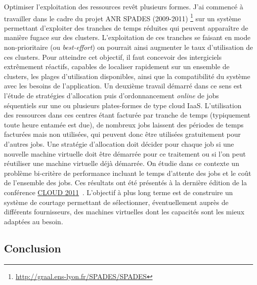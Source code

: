 \documentclass[11pt]{article}
\begin{document}
Optimiser l'exploitation des ressources revêt plusieurs formes. J'ai commencé à
travailler dans le cadre du projet ANR SPADES (2009-2011)%
\footnote{\url{http://graal.ens-lyon.fr/SPADES/SPADES}}  
sur un système permettant d'exploiter des tranches de temps réduites qui 
peuvent apparaître de manière fugace sur des clusters. L'exploitation de ces 
tranches se faisant en mode non-prioritaire (ou \textit{best-effort}) on 
pourrait ainsi augmenter le taux d'utilisation de ces clusters. Pour atteindre 
cet objectif, il faut concevoir des intergiciels extrêmement réactifs, capables 
de localiser rapidement sur un ensemble de clusters, les plages d'utilisation 
disponibles, ainsi que la compatibilité du système avec les besoins de 
l'application. Un deuxième travail démarré dans ce sens est l'étude de 
stratégies d'allocation puis d'ordonnancement \textit{online} de jobs 
séquentiels sur une ou plusieurs plates-formes de type cloud IaaS. 
L'utilisation des ressources dans ces centres étant facturée par tranche de 
temps (typiquement toute heure entamée est due), de nombreux jobs laissent des 
périodes de temps facturées mais non utilisées, qui peuvent donc être utilisées 
gratuitement pour d'autres jobs. Une stratégie d'allocation doit décider pour 
chaque job si une nouvelle machine virtuelle doit être démarrée pour ce 
traitement ou si l'on peut réutiliser une machine virtuelle déjà démarrée. On 
étudie dans ce contexte un problème bi-critère de performance incluant le temps 
d'attente des jobs et le coût de l'ensemble des jobs. Ces résultats ont été 
présentés à la dernière édition de la conférence 
\href{http://www.thecloudcomputing.org/2011/}{CLOUD 2011}~\cite{icps-2011-225}.
L'objectif à plus long terme est de construire un système de courtage permettant 
de sélectionner, éventuellement auprès de différents fournisseurs, des machines 
virtuelles dont les capacités sont les mieux adaptées au besoin.


\subsection*{Conclusion}
\end{document}

